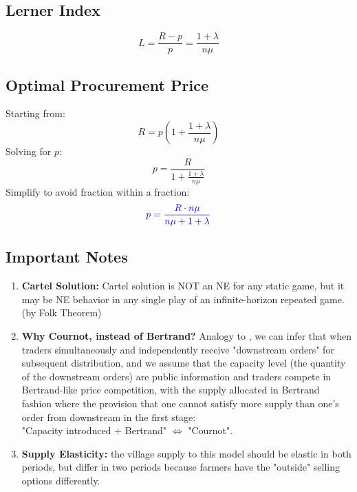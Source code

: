 \documentclass[12pt]{article}
\begin{document}
\subsection{Lerner Index}
\begin{equation}
L = \frac{R - p}{p} = \frac{1 + \lambda}{n \mu}
\end{equation}

\subsection{Optimal Procurement Price}
Starting from:
\begin{equation}
R = p \left(1 + \frac{1 + \lambda}{n \mu}\right)
\end{equation}
Solving for \( p \):
\begin{equation}
p = \frac{R}{1 + \frac{1 + \lambda}{n \mu}}
\end{equation}
Simplify to avoid fraction within a fraction:
\begin{equation}
\textcolor{blue}{p = \frac{R \cdot n \mu}{n \mu + 1 + \lambda}}
\label{Eq: optimal procure price, general case}
\end{equation}



\subsection{Important Notes}
\begin{enumerate}
    \item \textbf{Cartel Solution:} Cartel solution is NOT an NE for any static game, but it may be NE behavior in any single play of an infinite-horizon repeated game. (by Folk Theorem)
    
    \item \textbf{Why Cournot, instead of Bertrand?} Analogy to \cite{kreps1983quantity}, we can infer that when traders simultaneously and independently receive "downstream orders" for subsequent distribution, and we assume that the capacity level (the quantity of the downstream orders) are public information and traders compete in Bertrand-like price competition, with the supply allocated in Bertrand fashion where the provision that one cannot satisfy more supply than one's order from downstream in the first stage: \\
    "Capacity introduced + Bertrand" $\Longleftrightarrow$ "Cournot".

    \item \textbf{Supply Elasticity:} the village supply to this model should be elastic in both periods, but differ in two periods because farmers have the "outside" selling options differently. 
\end{enumerate}
\end{document}
